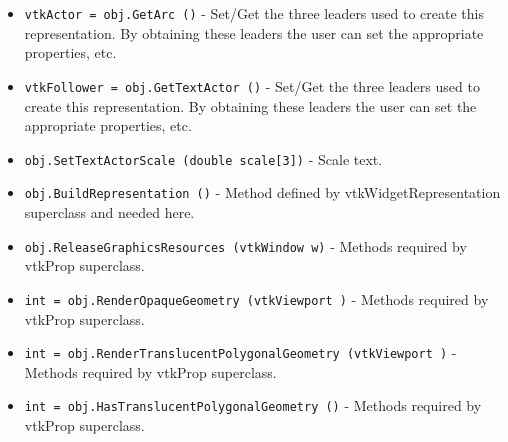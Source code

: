 \begin{itemize}
\item  \verb|vtkActor = obj.GetArc ()| -  Set/Get the three leaders used to create this representation.
 By obtaining these leaders the user can set the appropriate
 properties, etc.

\item  \verb|vtkFollower = obj.GetTextActor ()| -  Set/Get the three leaders used to create this representation.
 By obtaining these leaders the user can set the appropriate
 properties, etc.

\item  \verb|obj.SetTextActorScale (double scale[3])| -  Scale text.

\item  \verb|obj.BuildRepresentation ()| -  Method defined by vtkWidgetRepresentation superclass and
 needed here.

\item  \verb|obj.ReleaseGraphicsResources (vtkWindow w)| -  Methods required by vtkProp superclass.

\item  \verb|int = obj.RenderOpaqueGeometry (vtkViewport )| -  Methods required by vtkProp superclass.

\item  \verb|int = obj.RenderTranslucentPolygonalGeometry (vtkViewport )| -  Methods required by vtkProp superclass.

\item  \verb|int = obj.HasTranslucentPolygonalGeometry ()| -  Methods required by vtkProp superclass.

\end{itemize}
